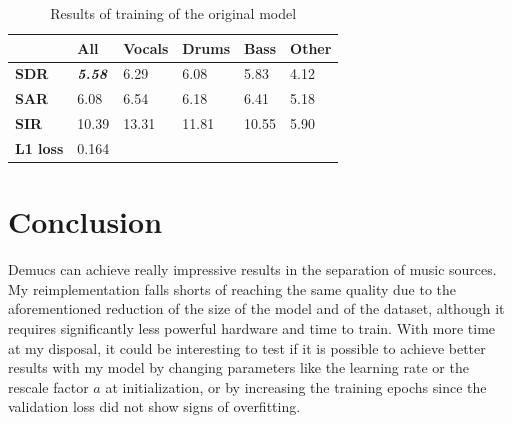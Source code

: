\documentclass[12pt]{article}
\begin{document}
\begin{table}[h]
\centering
\begin{tabular}{l|l|llll}
                 & \textbf{All}           & \multicolumn{1}{l|}{\textbf{Vocals}} & \multicolumn{1}{l|}{\textbf{Drums}} & \multicolumn{1}{l|}{\textbf{Bass}} & \textbf{Other} \\ \hline
\textbf{SDR}     & \textit{\textbf{5.58}} & \multicolumn{1}{l|}{6.29}            & \multicolumn{1}{l|}{6.08}           & \multicolumn{1}{l|}{5.83}          & 4.12           \\ \hline
\textbf{SAR}     & 6.08                   & \multicolumn{1}{l|}{6.54}            & \multicolumn{1}{l|}{6.18}           & \multicolumn{1}{l|}{6.41}          & 5.18           \\ \hline
\textbf{SIR}     & 10.39                  & \multicolumn{1}{l|}{13.31}           & \multicolumn{1}{l|}{11.81}          & \multicolumn{1}{l|}{10.55}         & 5.90           \\ \hline
\textbf{L1 loss} & 0.164                  &                                      &                                     &                                    &               
\end{tabular}
\caption{Results of training of the original model}
\label{tab:results-original}
\end{table}

\newpage
\section{Conclusion}\label{sec:conclusion}
Demucs can achieve really impressive results in the separation of music sources. My reimplementation falls shorts of reaching the same quality due to the aforementioned reduction of the size of the model and of the dataset, although it requires significantly less powerful hardware and time to train. With more time at my disposal, it could be interesting to test if it is possible to achieve better results with my model by changing parameters like the learning rate or the rescale factor \(a\) at initialization, or by increasing the training epochs since the validation loss did not show signs of overfitting.

\newpage

 
\end{document}

